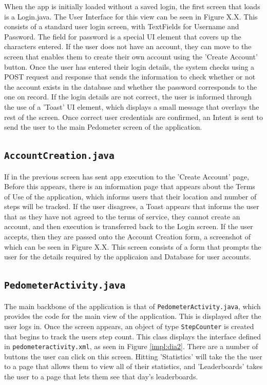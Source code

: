 \documentclass{l4proj}
\begin{document}
When the app is initially loaded without a saved login, the first screen that loads is a Login.java. The User Interface for this view can be seen in Figure X.X. This consists of a standard user login screen, with TextFields for Username and Password. The field for password is a special UI element that covers up the characters entered. If the user does not have an account, they can move to the screen that enables them to create their own account using the 'Create Account' button. Once the user has entered their login details, the system checks using a POST request and response that sends the information to check whether or not the account exists in the database and whether the password corresponds to the one on record. If the login details are not correct, the user is informed through the use of a 'Toast' UI element, which displays a small message that overlays the rest of the screen. Once correct user credentials are confirmed, an Intent is sent to send the user to the main Pedometer screen of the application. 

\subsection{\texttt{AccountCreation.java}}

If in the previous screen has sent app execution to the 'Create Account' page, Before this appears, there is an information page that appears about the Terms of Use of the application, which informs users that their location and number of steps will be tracked. If the user disagrees, a Toast appears that informs the user that as they have not agreed to the terms of service, they cannot create an account, and then execution is transferred back to the Login screen. If the user accepts, then they are passed onto the Account Creation form, a screenshot of which can be seen in Figure X.X. This screen consists of a form that prompts the user for the details required by the applicaion and Database for user accounts. 

\subsection{\texttt{PedometerActivity.java}}

The main backbone of the application is that of \texttt{PedometerActivity.java}, which provides the code for the main view of the application. This is displayed after the user logs in. Once the screen appears, an object of type \texttt{StepCounter} is created that begins to track the users step count. This class displays the interface defined in \texttt{pedometeractivity.xml}, as seen in Figure \ref{impl:dia2}. There are a number of buttons the user can click on this screen. Hitting 'Statistics' will take the the user to a page that allows them to view all of their statistics, and 'Leaderboards' takes the user to a page that lets them see that day's leaderboards. 
\end{document}
